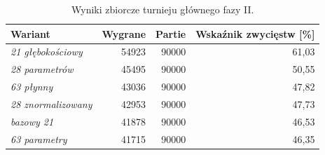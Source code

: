 \begin{table}[ht]
\centering
\small
\begin{tabular}{lrrr}
\toprule
Wariant & Wygrane & Partie & Wskaźnik zwycięstw [\%] \\
\midrule
\textit{21 głębokościowy} & 54923 & 90000 & 61,03 \\
\textit{28 parametrów} & 45495 & 90000 & 50,55 \\
\textit{63 płynny} & 43036 & 90000 & 47,82 \\
\textit{28 znormalizowany} & 42953 & 90000 & 47,73 \\
\textit{bazowy 21} & 41878 & 90000 & 46,53 \\
\textit{63 parametry} & 41715 & 90000 & 46,35 \\
\bottomrule
\end{tabular}
\caption{Wyniki zbiorcze turnieju głównego fazy II.}
\label{tab:phase2-aggregate-results}
\end{table}

